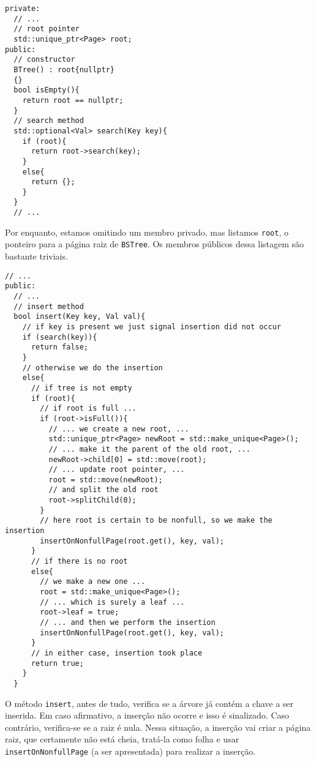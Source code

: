 \documentclass[11pt]{article}
\begin{document}
\begin{verbatim}
private:
  // ...
  // root pointer
  std::unique_ptr<Page> root;
public:
  // constructor
  BTree() : root{nullptr}
  {}
  bool isEmpty(){
    return root == nullptr;
  }
  // search method
  std::optional<Val> search(Key key){
    if (root){
      return root->search(key);
    }
    else{
      return {};
    }
  }
  // ...
\end{verbatim}

Por enquanto, estamos omitindo um membro privado, mas listamos
\texttt{root}, o ponteiro para a página raiz de \texttt{BSTree}.  Os membros
públicos dessa listagem são bastante triviais.

\pagebreak

\begin{verbatim}
// ...
public:
  // ...
  // insert method
  bool insert(Key key, Val val){
    // if key is present we just signal insertion did not occur
    if (search(key)){
      return false;
    }
    // otherwise we do the insertion
    else{
      // if tree is not empty
      if (root){
        // if root is full ...
        if (root->isFull()){
          // ... we create a new root, ...
          std::unique_ptr<Page> newRoot = std::make_unique<Page>();
          // ... make it the parent of the old root, ...
          newRoot->child[0] = std::move(root);
          // ... update root pointer, ...
          root = std::move(newRoot);
          // and split the old root
          root->splitChild(0);
        }
        // here root is certain to be nonfull, so we make the insertion
        insertOnNonfullPage(root.get(), key, val);
      }
      // if there is no root
      else{
        // we make a new one ...
        root = std::make_unique<Page>();
        // ... which is surely a leaf ...
        root->leaf = true;
        // ... and then we perform the insertion
        insertOnNonfullPage(root.get(), key, val);
      }
      // in either case, insertion took place
      return true;
    }
  }
\end{verbatim}

O método \texttt{insert}, antes de tudo, verifica se a árvore já contém a
chave a ser inserida.  Em caso afirmativo, a inserção não ocorre e
isso é sinalizado.  Caso contrário, verifica-se se a raiz é nula.
Nessa situação, a inserção vai criar a página raiz, que certamente
não está cheia, tratá-la como folha e usar \texttt{insertOnNonfullPage}
(a ser apresentada) para realizar a inserção.
\end{document}
